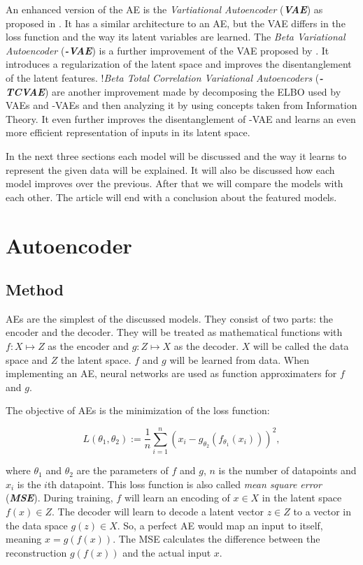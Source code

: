 \documentclass[a4paper]{IEEEtran}
\begin{document}
An enhanced version of the AE is the \textit{Vartiational Autoencoder} (\textit{\textbf{VAE}}) as proposed in \cite{kingma2014autoencoding}. It has a similar architecture to an AE, but the VAE differs in the loss function and the way its latent variables are learned. The \textit{Beta Variational Autoencoder} (\textit{\textbf{\textbeta -VAE}}) is a further improvement of the VAE proposed by \cite{higgins2017vae}. It introduces a regularization of the latent space and improves the disentanglement of the latent features. !\textit{Beta Total Correlation Variational Autoencoders} (\textit{\textbf{\textbeta -TCVAE}}) \cite{chen2019isolating} are another improvement made by decomposing the ELBO used by VAEs and \textbeta -VAEs and then analyzing it by using concepts taken from Information Theory. It even further improves the disentanglement of \textbeta -VAE and learns an even more efficient representation of inputs in its latent space.

In the next three sections each model will be discussed and the way it learns to represent the given data will be explained. It will also be discussed how each model improves over the previous. After that we will compare the models with each other. The article will end with a conclusion about the featured models.

\section{Autoencoder}
\subsection{Method}
AEs are the simplest of the discussed models. They consist of two parts: the encoder and the decoder. They will be treated as mathematical functions with $f : X \mapsto Z$ as the encoder and $g : Z \mapsto X$ as the decoder. $X$ will be called the data space and $Z$ the latent space. $f$ and $g$ will be learned from data. When implementing an AE, neural networks are used as function approximaters for $f$ and $g$.

The objective of AEs is the minimization of the loss function:

\begin{equation}
	L(\theta_1, \theta_2) := \frac{1}{n} \sum_{i = 1}^{n}{(x_i - g_{\theta_2}(f_{\theta_1}(x_i)))^2},
	\label{mse}
\end{equation}

where $\theta_1$ and $\theta_2$ are the parameters of $f$ and $g$, $n$ is the number of datapoints and $x_i$ is the $i$th datapoint. This loss function is also called \textit{mean square error} (\textit{\textbf{MSE}}). During training, $f$ will learn an encoding of $x \in X$ in the latent space $f(x) \in Z$. The decoder will learn to decode a latent vector $z \in Z$ to a vector in the data space $g(z) \in X$. So, a perfect AE would map an input to itself, meaning $x = g(f(x))$. The MSE calculates the difference between the reconstruction $g(f(x))$ and the actual input $x$.
\end{document}
